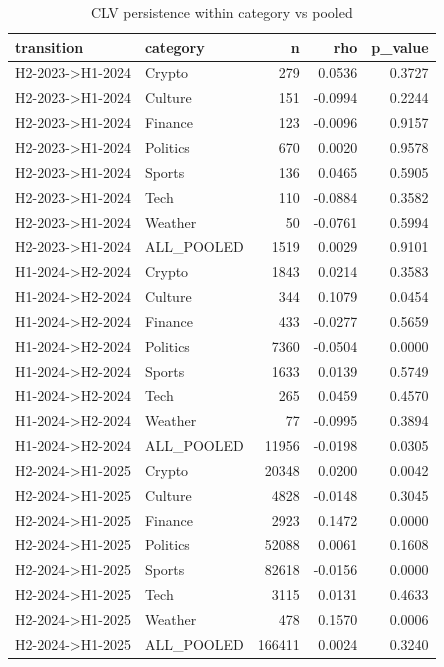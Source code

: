 \begin{table}
\caption{CLV persistence within category vs pooled}
\label{tab:cat_persistence}
\begin{tabular}{llrrr}
\toprule
transition & category & n & rho & p_value \\
\midrule
H2-2023->H1-2024 & Crypto & 279 & 0.0536 & 0.3727 \\
H2-2023->H1-2024 & Culture & 151 & -0.0994 & 0.2244 \\
H2-2023->H1-2024 & Finance & 123 & -0.0096 & 0.9157 \\
H2-2023->H1-2024 & Politics & 670 & 0.0020 & 0.9578 \\
H2-2023->H1-2024 & Sports & 136 & 0.0465 & 0.5905 \\
H2-2023->H1-2024 & Tech & 110 & -0.0884 & 0.3582 \\
H2-2023->H1-2024 & Weather & 50 & -0.0761 & 0.5994 \\
H2-2023->H1-2024 & ALL_POOLED & 1519 & 0.0029 & 0.9101 \\
H1-2024->H2-2024 & Crypto & 1843 & 0.0214 & 0.3583 \\
H1-2024->H2-2024 & Culture & 344 & 0.1079 & 0.0454 \\
H1-2024->H2-2024 & Finance & 433 & -0.0277 & 0.5659 \\
H1-2024->H2-2024 & Politics & 7360 & -0.0504 & 0.0000 \\
H1-2024->H2-2024 & Sports & 1633 & 0.0139 & 0.5749 \\
H1-2024->H2-2024 & Tech & 265 & 0.0459 & 0.4570 \\
H1-2024->H2-2024 & Weather & 77 & -0.0995 & 0.3894 \\
H1-2024->H2-2024 & ALL_POOLED & 11956 & -0.0198 & 0.0305 \\
H2-2024->H1-2025 & Crypto & 20348 & 0.0200 & 0.0042 \\
H2-2024->H1-2025 & Culture & 4828 & -0.0148 & 0.3045 \\
H2-2024->H1-2025 & Finance & 2923 & 0.1472 & 0.0000 \\
H2-2024->H1-2025 & Politics & 52088 & 0.0061 & 0.1608 \\
H2-2024->H1-2025 & Sports & 82618 & -0.0156 & 0.0000 \\
H2-2024->H1-2025 & Tech & 3115 & 0.0131 & 0.4633 \\
H2-2024->H1-2025 & Weather & 478 & 0.1570 & 0.0006 \\
H2-2024->H1-2025 & ALL_POOLED & 166411 & 0.0024 & 0.3240 \\
\bottomrule
\end{tabular}
\end{table}
